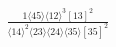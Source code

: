 \documentclass[varwidth, border=5pt]{standalone}
\begin{document}
\begin{my}
$\begin{gathered}
\scriptscriptstyle\frac{1⟨45⟩⟨12⟩^3[13]^2}{⟨14⟩^2⟨23⟩⟨24⟩⟨35⟩[35]^2}
\end{gathered}$
\end{my}
\end{document}
